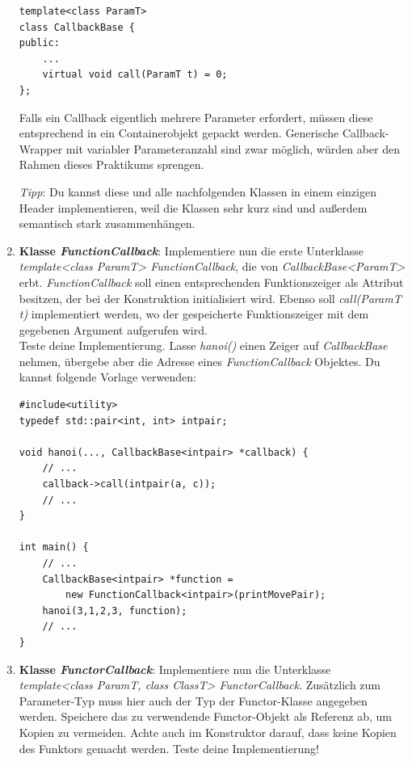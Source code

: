 \begin{enumerate}
\begin{lstlisting}
template<class ParamT>
class CallbackBase {
public:
	...
	virtual void call(ParamT t) = 0;
};
\end{lstlisting} 

Falls ein Callback eigentlich mehrere Parameter erfordert, müssen diese entsprechend in ein Containerobjekt gepackt werden.
Generische Callback-Wrapper mit variabler Parameteranzahl sind zwar möglich, würden aber den Rahmen dieses Praktikums sprengen.

\emph{Tipp}: Du kannst diese und alle nachfolgenden Klassen in einem einzigen Header implementieren, weil die Klassen sehr kurz sind und außerdem semantisch stark zusammenhängen.


\item
\textbf{Klasse \emph{FunctionCallback}}:
Implementiere nun die erste Unterklasse \emph{template<class ParamT> FunctionCallback}, die von \emph{CallbackBase<ParamT>} erbt.  \emph{FunctionCallback} soll einen entsprechenden Funktionszeiger als Attribut besitzen, der bei der Konstruktion initialisiert wird.
Ebenso soll \emph{call(ParamT t)} implementiert werden, wo der gespeicherte Funktionszeiger mit dem gegebenen Argument aufgerufen wird. \\

Teste deine Implementierung.
Lasse \emph{hanoi()} einen Zeiger auf \emph{CallbackBase} nehmen, übergebe aber die Adresse eines \emph{FunctionCallback} Objektes.
Du kannst folgende Vorlage verwenden:
\begin{lstlisting}
#include<utility>
typedef std::pair<int, int> intpair;

void hanoi(..., CallbackBase<intpair> *callback) {
	// ...
	callback->call(intpair(a, c));
	// ...
}

int main() {
	// ...
	CallbackBase<intpair> *function = 
	    new FunctionCallback<intpair>(printMovePair);
	hanoi(3,1,2,3, function);
	// ...
}
\end{lstlisting}


\item
\textbf{Klasse \emph{FunctorCallback}}:
Implementiere nun die Unterklasse \emph{template<class ParamT, class ClassT> FunctorCallback}.
Zusätzlich zum Parameter-Typ muss hier auch der Typ der Functor-Klasse angegeben werden.
Speichere das zu verwendende Functor-Objekt als Referenz ab, um Kopien zu vermeiden.
Achte auch im Konstruktor darauf, dass keine Kopien des Funktors gemacht werden.
Teste deine Implementierung! 




\end{enumerate}
